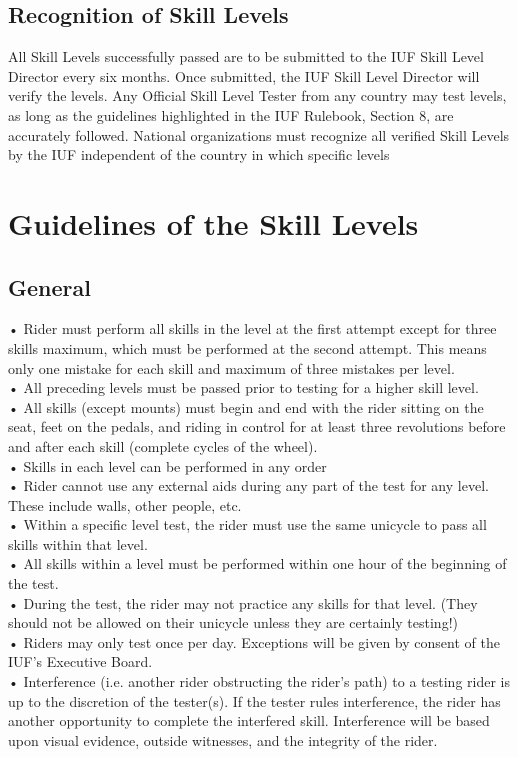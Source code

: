 \subsection{ Recognition of Skill Levels}
All Skill Levels successfully passed are to be submitted to the IUF Skill Level Director every six months. Once
submitted, the IUF Skill Level Director will verify the levels. Any Official Skill Level Tester from any country may
test levels, as long as the guidelines highlighted in the IUF Rulebook, Section 8, are accurately followed. National
organizations must recognize all verified Skill Levels by the IUF independent of the country in which specific levels
\section{Guidelines of the Skill Levels}
\subsection{General}
• Rider must perform all skills in the level at the first attempt except for three skills maximum, which must be
performed at the second attempt. This means only one mistake for each skill and maximum of three mistakes per
level.\\
• All preceding levels must be passed prior to testing for a higher skill level.\\
• All skills (except mounts) must begin and end with the rider sitting on the seat, feet on the pedals, and riding in
control for at least three revolutions before and after each skill (complete cycles of the wheel).\\
• Skills in each level can be performed in any order\\
• Rider cannot use any external aids during any part of the test for any level. These include walls, other people, etc.\\
• Within a specific level test, the rider must use the same unicycle to pass all skills within that level.\\
• All skills within a level must be performed within one hour of the beginning of the test.\\
• During the test, the rider may not practice any skills for that level. (They should not be allowed on their unicycle
unless they are certainly testing!)\\
• Riders may only test once per day. Exceptions will be given by consent of the IUF's Executive Board.\\
• Interference (i.e. another rider obstructing the rider's path) to a testing rider is up to the discretion of the tester(s). If
the tester rules interference, the rider has another opportunity to complete the interfered skill. Interference will be
based upon visual evidence, outside witnesses, and the integrity of the rider.

